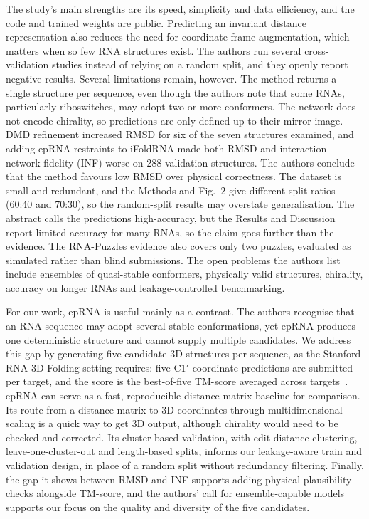 \documentclass{FastFyp}
\begin{document}
The study's main strengths are its speed, simplicity and data efficiency, and the code and trained weights are public. Predicting an invariant distance representation also reduces the need for coordinate-frame augmentation, which matters when so few RNA structures exist. The authors run several cross-validation studies instead of relying on a random split, and they openly report negative results. Several limitations remain, however. The method returns a single structure per sequence, even though the authors note that some RNAs, particularly riboswitches, may adopt two or more conformers. The network does not encode chirality, so predictions are only defined up to their mirror image. DMD refinement increased RMSD for six of the seven structures examined, and adding epRNA restraints to iFoldRNA made both RMSD and interaction network fidelity (INF) worse on 288 validation structures. The authors conclude that the method favours low RMSD over physical correctness. The dataset is small and redundant, and the Methods and Fig.~2 give different split ratios (60:40 and 70:30), so the random-split results may overstate generalisation. The abstract calls the predictions high-accuracy, but the Results and Discussion report limited accuracy for many RNAs, so the claim goes further than the evidence. The RNA-Puzzles evidence also covers only two puzzles, evaluated as simulated rather than blind submissions. The open problems the authors list include ensembles of quasi-stable conformers, physically valid structures, chirality, accuracy on longer RNAs and leakage-controlled benchmarking.

For our work, epRNA is useful mainly as a contrast. The authors recognise that an RNA sequence may adopt several stable conformations, yet epRNA produces one deterministic structure and cannot supply multiple candidates. We address this gap by generating five candidate 3D structures per sequence, as the Stanford RNA 3D Folding setting requires: five C1$'$-coordinate predictions are submitted per target, and the score is the best-of-five TM-score averaged across targets~\cite{leerna}. epRNA can serve as a fast, reproducible distance-matrix baseline for comparison. Its route from a distance matrix to 3D coordinates through multidimensional scaling is a quick way to get 3D output, although chirality would need to be checked and corrected. Its cluster-based validation, with edit-distance clustering, leave-one-cluster-out and length-based splits, informs our leakage-aware train and validation design, in place of a random split without redundancy filtering. Finally, the gap it shows between RMSD and INF supports adding physical-plausibility checks alongside TM-score, and the authors' call for ensemble-capable models supports our focus on the quality and diversity of the five candidates.
\end{document}
